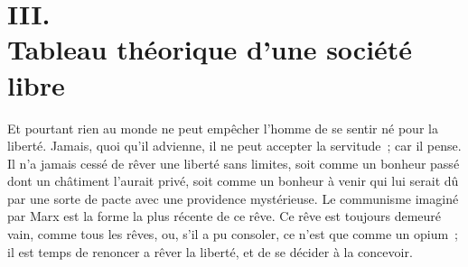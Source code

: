 \documentclass[french,twoside]{book} %
\begin{document}
\begin{center}
\noindent \centerline{}
\end{center}

\section[{III. Tableau théorique d’une société libre}]{III. \\
Tableau théorique d’une société libre}\renewcommand{\leftmark}{III. \\
Tableau théorique d’une société libre}

\noindent \par
Et pourtant rien au monde ne peut empêcher l'homme de se sentir né pour la liberté. Jamais, quoi qu'il advienne, il ne peut accepter la servitude ; car il pense. Il n'a jamais cessé de rêver une liberté sans limites, soit comme un bonheur passé dont un châtiment l'aurait privé, soit comme un bonheur à venir qui lui serait dû par une sorte de pacte avec une providence mystérieuse. Le communisme imaginé par Marx est la forme la plus récente de ce rêve. Ce rêve est toujours demeuré vain, comme tous les rêves, ou, s'il a pu consoler, ce n'est que comme un opium ; il est temps de renoncer a rêver la liberté, et de se décider à la concevoir.\par
\end{document}
